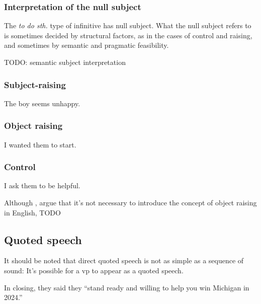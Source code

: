 \documentclass[UTF8, a4paper, oneside, scheme=plain]{ctexrep}
\newcommand*{\citepage}[1]{p.~{#1}}
\newcommand{\corpus}[1]{\emph{#1}}
\begin{document}
\subsubsection{Interpretation of the null subject}

The \corpus{to do sth.} type of infinitive has null subject.
What the null subject refers to is sometimes decided by structural factors,
as in the cases of control and raising,
and sometimes by semantic and pragmatic feasibility.

TODO: semantic subject interpretation



\subsubsection{Subject-raising}

\begin{exe}
    \ex The boy seems unhappy.
\end{exe}

\subsubsection{Object raising}

\begin{exe}
    \ex I wanted them to start.
\end{exe}

\subsubsection{Control}

\begin{exe}
    \ex I ask them to be helpful.
\end{exe}

Although \citet[\citepage{15}]{dixon2005semantic}, \citet[\citepage{388}]{dixon2010basic2} argue that 
it's not necessary to introduce the concept of object raising in English, TODO

\subsection{Quoted speech}

It should be noted that direct quoted speech 
is not as simple as a sequence of sound:
It's possible for a \acs{vp} 
to appear as a quoted speech.

\begin{exe}
    \ex In closing, they said they ``stand ready and willing to help you win Michigan in 2024.''
\end{exe}
\end{document}
